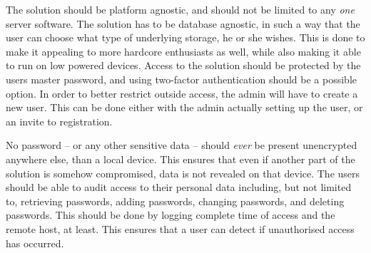 			The solution should be platform agnostic, and should not be limited to any \emph{one} server software. The solution has to be database agnostic, in such a way that the user can choose what type of underlying storage, he or she wishes. This is done to make it appealing to more hardcore enthusiasts as well, while also making it able to run on low powered devices. Access to the solution should be protected by the users master password, and using two-factor authentication should be a possible option. In order to better restrict outside access, the admin will have to create a new user. This can be done either with the admin actually setting up the user, or an invite to registration.

			No password -- or any other sensitive data -- should \emph{ever} be present unencrypted anywhere else, than a local device. This ensures that even if another part of the solution is somehow compromised, data is not revealed on that device.  The users should be able to audit access to their personal data including, but not limited to, retrieving passwords, adding passwords, changing passwords, and deleting passwords. This should be done by logging complete time of access and the remote host, at least. This ensures that a user can detect if unauthorised access has occurred.

